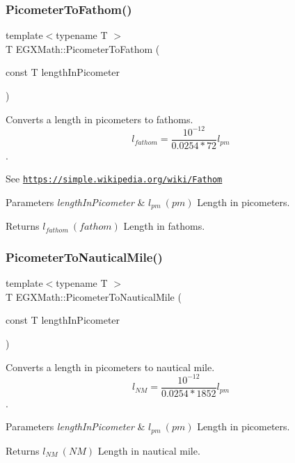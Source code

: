 \subsubsection{\texorpdfstring{Picometer\+To\+Fathom()}{PicometerToFathom()}}
{\footnotesize\ttfamily template$<$typename T $>$ \\
T E\+G\+X\+Math\+::\+Picometer\+To\+Fathom (\begin{DoxyParamCaption}\item[{const T}]{length\+In\+Picometer }\end{DoxyParamCaption})}



Converts a length in picometers to fathoms. \[ l_{fathom}= \frac{10^{-12}}{0.0254 * 72} l_{pm} \]. 

See \href{https://simple.wikipedia.org/wiki/Fathom}{\tt https\+://simple.\+wikipedia.\+org/wiki/\+Fathom} 
\begin{DoxyParams}{Parameters}
{\em length\+In\+Picometer} & $ l_{pm}\ (pm)$ Length in picometers. \\
\hline
\end{DoxyParams}
\begin{DoxyReturn}{Returns}
$ l_{fathom}\ (fathom)$ Length in fathoms. 
\end{DoxyReturn}
\mbox{\label{group___e_g_x_math-_conversions-_length_conversions-_s_i-_picometer-_nautical_ga7127ef6c7c68736b7a24d2c65b8ac858}} 
\subsubsection{\texorpdfstring{Picometer\+To\+Nautical\+Mile()}{PicometerToNauticalMile()}}
{\footnotesize\ttfamily template$<$typename T $>$ \\
T E\+G\+X\+Math\+::\+Picometer\+To\+Nautical\+Mile (\begin{DoxyParamCaption}\item[{const T}]{length\+In\+Picometer }\end{DoxyParamCaption})}



Converts a length in picometers to nautical mile. \[ l_{NM}= \frac{10^{-12}}{0.0254 * 1852} l_{pm} \]. 


\begin{DoxyParams}{Parameters}
{\em length\+In\+Picometer} & $ l_{pm}\ (pm)$ Length in picometers. \\
\hline
\end{DoxyParams}
\begin{DoxyReturn}{Returns}
$ l_{NM}\ (NM)$ Length in nautical mile. 
\end{DoxyReturn}
